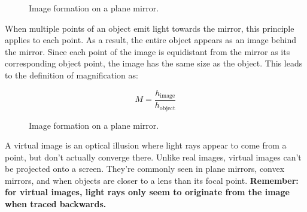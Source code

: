 \documentclass[
  a4paper,
]{book}
\begin{document}
\begin{figure}
\begin{minipage}{0.56\linewidth}
{}

\subcaption{\label{fig-reflection-plane}}

\end{minipage}%

\caption{\label{fig-plane-mirror-combined}Image formation on a plane
mirror.}

\end{figure}%

When multiple points of an object emit light towards the mirror, this
principle applies to each point. As a result, the entire object appears
as an image behind the mirror. Since each point of the image is
equidistant from the mirror as its corresponding object point, the image
has the same size as the object. This leads to the definition of
magnification as:

\[
M=\frac{h_{\text{image}}}{h_{\text{object}}}
\]

\begin{figure}


\caption{\label{fig-plane-mirror}Image formation on a plane mirror.}

\end{figure}%

\begin{tcolorbox}[enhanced jigsaw, coltitle=black, title=\textcolor{quarto-callout-note-color}{\faInfo}\hspace{0.5em}{Virtual Images}, colframe=quarto-callout-note-color-frame, toprule=.15mm, opacitybacktitle=0.6, left=2mm, opacityback=0, breakable, toptitle=1mm, bottomtitle=1mm, leftrule=.75mm, arc=.35mm, titlerule=0mm, colbacktitle=quarto-callout-note-color!10!white, rightrule=.15mm, bottomrule=.15mm, colback=white]

A virtual image is an optical illusion where light rays appear to come
from a point, but don't actually converge there. Unlike real images,
virtual images can't be projected onto a screen. They're commonly seen
in plane mirrors, convex mirrors, and when objects are closer to a lens
than its focal point. \textbf{Remember: for virtual images, light rays
only seem to originate from the image when traced backwards.}

\end{tcolorbox}
\end{document}

